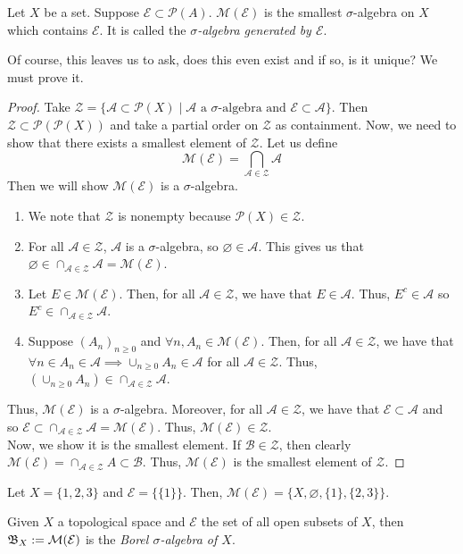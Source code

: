 \documentclass[11pt,leqno,oneside]{amsbook}
\numberwithin{thm}{section}
\renewcommand{\P}{\mathcal{P}} %
\renewcommand{\A}{\mathcal{A}} %
\newcommand{\M}{\mathcal{M}} %
\newcommand{\Ep}{\mathcal{E}} %
\newcommand{\s}{$\sigma$-} %
\begin{document}
\begin{defn}
  Let $X$ be a set. Suppose $\Ep \subset \P(A)$. $\M(\Ep)$ is the
  smallest \s algebra on $X$ which contains $\Ep$.  It is called the
  \emph{\s algebra generated by $\Ep$}.
\end{defn}
Of course, this leaves us to ask, does this even exist and if so, is
it unique? We must prove it.
\begin{proof}
  Take $\mathcal{Z} = \{\A \subset \P(X) \mid \A \text{ a }
  \sigma\text{-algebra and } \Ep \subset \A\}$. Then $\mathcal{Z}
  \subset \P(\P(X))$ and take a partial order on $\mathcal{Z}$ as
  containment. Now, we need to show that there exists a smallest
  element of $\mathcal{Z}$. Let us define \[
    \M(\Ep) = \bigcap_{\A \in \mathcal{Z}} \A
  \]
  Then we will show $\M(\Ep)$ is a \s algebra.
  \begin{enumerate}
  \item We note that $\mathcal{Z}$ is nonempty because $\P(X) \in \mathcal{Z}$.
  \item For all $\A \in \mathcal{Z}$, $\A$ is a \s algebra, so
    $\varnothing \in \A$. This gives us that $\varnothing \in \cap_{\A
      \in \mathcal{Z}} \A = \M(\Ep)$.
  \item Let $E \in \M(\Ep)$. Then, for all $\A \in \mathcal{Z}$, we have that
    $E \in \A$. Thus, $E^c \in \A$ so $E^c \in \cap_{\A \in \mathcal{Z}} \A$.
  \item Suppose $(A_n)_{n \geq 0}$ and $\forall n, A_n \in
    \M(\Ep)$. Then, for all $\A \in \mathcal{Z}$, we have that $\forall n \in
    A_n \in \A \implies \cup_{n \geq 0} A_n \in \A$ for all $\A
    \in \mathcal{Z}$. Thus, $(\cup_{n \geq 0} A_n) \in \cap_{\A \in \mathcal{Z}} \A$.
  \end{enumerate}
  Thus, $\M(\Ep)$ is a \s algebra. Moreover, for all $\A \in
  \mathcal{Z}$, we have that $\Ep \subset \A$ and so $\Ep \subset \cap_{\A \in
    \mathcal{Z}} \A = \M(\Ep)$. Thus, $\M(\Ep) \in \mathcal{Z}$. \\

  Now, we show it is the smallest element. If $\mathscr{B} \in
  \mathcal{Z}$, then clearly $\M(\Ep) = \cap_{\A \in \mathcal{Z}} A
  \subset \mathscr{B}$. Thus, $\M(\Ep)$ is the smallest element of
  $\mathcal{Z}$.
\end{proof}
\begin{example}
  Let $X = \{1,2,3\}$ and $\Ep = \{\{1\}\}$. Then, $\M(\Ep) = \{X,
  \varnothing, \{1\},\{2,3\}\}$.
\end{example}
\begin{defn}
  Given $X$ a topological space and $\Ep$ the set of all open subsets of $X$,
  then $\B_X := \M(\Ep)$ is the \emph{Borel \s algebra of $X$}.
\end{defn}
\end{document}
